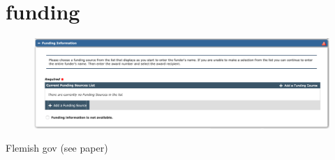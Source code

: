 \documentclass{article}
\begin{document}
\section*{funding}


\begin{figure}[h!]
    \centering
    \includegraphics[width=\textwidth]{funding}
\end{figure}

Flemish gov (see paper)
\end{document}
